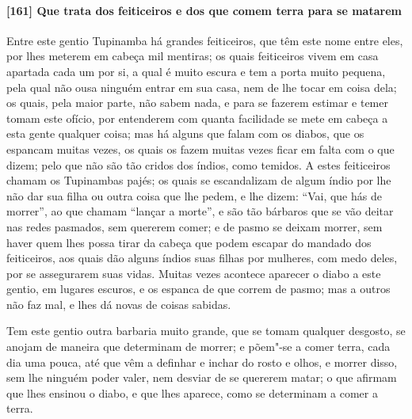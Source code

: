 \begin{linenumbers}
\paragraph{[161] Que trata dos feiticeiros e dos que comem terra para se matarem}\quad
Entre este gentio Tupinamba há grandes feiticeiros, que têm este nome entre eles, por lhes
meterem em cabeça mil mentiras; os quais feiticeiros vivem em casa apartada cada um por
si, a qual é muito escura e tem a porta muito pequena, pela qual não ousa ninguém entrar
em sua casa, nem de lhe tocar em coisa dela; os quais, pela maior parte, não sabem nada, e
para se fazerem estimar e temer tomam este ofício, por entenderem com quanta facilidade se
mete em cabeça a esta gente qualquer coisa; mas há alguns que falam com os diabos, que os
espancam muitas vezes, os quais os fazem muitas vezes ficar em falta com o que dizem; pelo
que não são tão cridos dos índios, como temidos. A estes feiticeiros chamam os Tupinambas
pajés; os quais se escandalizam de algum índio por lhe não dar sua filha ou outra coisa
que lhe pedem, e lhe dizem: ``Vai, que hás de morrer'', ao que chamam ``lançar a morte'',
e são tão bárbaros que se vão deitar nas redes pasmados, sem quererem comer; e de pasmo se
deixam morrer, sem haver quem lhes possa tirar da cabeça que podem escapar do mandado dos
feiticeiros, aos quais dão alguns índios suas filhas por mulheres, com medo deles, por se
assegurarem suas vidas. Muitas vezes acontece aparecer o diabo a este gentio, em lugares
escuros, e os espanca de que correm de pasmo; mas a outros não faz mal, e lhes dá novas de
coisas sabidas.

Tem este gentio outra barbaria muito grande, que se tomam qualquer desgosto, se anojam de
maneira que determinam de morrer; e põem"-se a comer terra, cada dia uma pouca, até que vêm
a definhar e inchar do rosto e olhos, e morrer disso, sem lhe ninguém poder valer, nem
desviar de se quererem matar; o que afirmam que lhes ensinou o diabo, e que lhes aparece,
como se determinam a comer a terra.


\end{linenumbers}
